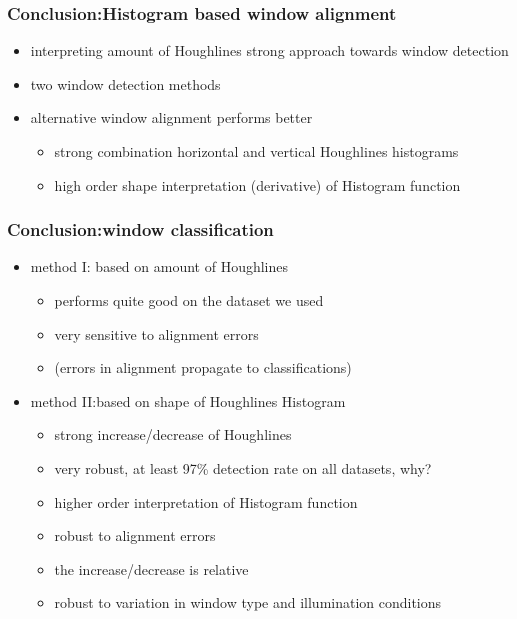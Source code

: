 \documentclass{beamer}
\begin{document}
\frame
{
	\frametitle{Conclusion:Histogram based window alignment}		

	\begin{itemize}
	\item <+-| alert@+> interpreting amount of Houghlines strong approach towards window
	detection
	\item <+-| alert@+> two window detection methods
	\item <+-| alert@+> alternative window alignment performs better
		\begin{itemize}
		\item <+-| alert@+> strong combination horizontal and vertical Houghlines histograms
		\item <+-| alert@+> high order shape interpretation (derivative) of Histogram function
		\end{itemize}
	
	
	\end{itemize}

}
\frame
{
	\frametitle{Conclusion:window classification}		
	\begin{itemize}
	\item <+-| alert@+> method I: based on amount of Houghlines
		\begin{itemize}
		\item <+-| alert@+> performs quite good on the dataset we used
		\item <+-| alert@+> very sensitive to alignment errors
		\item <+-| alert@+> (errors in alignment propagate to classifications)
		\end{itemize}
	\item <+-| alert@+> method II:based on shape of Houghlines Histogram
		\begin{itemize}
		\item <+-| alert@+> strong increase/decrease of Houghlines
		\item <+-| alert@+> very robust, at least 97\% detection rate on all datasets, why?
		\item <+-| alert@+> higher order interpretation of Histogram function
		\item <+-| alert@+> robust to alignment errors 
		\item <+-| alert@+> the increase/decrease is relative
		\item <+-| alert@+> robust to variation in window type and illumination conditions
		\end{itemize}
	\end{itemize}
}
\end{document}
